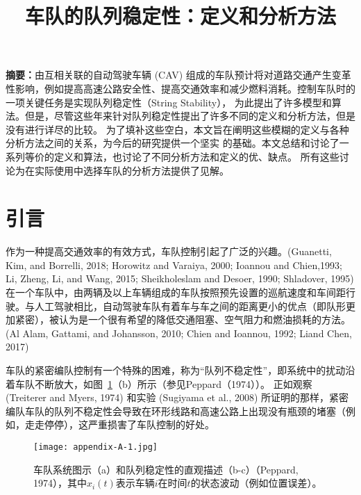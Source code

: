 
\begin{translation}
\label{cha:translation}

\title{车队的队列稳定性：定义和分析方法}
\maketitle


  \vspace{1em}
  \textbf{摘要：}由互相关联的自动驾驶车辆 (CAV) 组成的车队预计将对道路交通产生变革性影响，例如提高高速公路安全性、提高交通效率和减少燃料消耗。控制车队时的一项关键任务是实现队列稳定性（String Stability），
  为此提出了许多模型和算法。但是，尽管这些年来针对队列稳定性提出了许多不同的定义和分析方法，但是没有进行详尽的比较。 为了填补这些空白，本文旨在阐明这些模糊的定义与各种分析方法之间的关系，为今后的研究提供一个坚实
  的基础。本文总结和讨论了一系列等价的定义和算法，也讨论了不同分析方法和定义的优、缺点。 所有这些讨论为在实际使用中选择车队的分析方法提供了见解。

\section{引言}

  作为一种提高交通效率的有效方式，车队控制引起了广泛的兴趣。(Guanetti, Kim, and Borrelli, 2018; Horowitz and Varaiya, 2000; Ioannou and Chien,1993; Li, Zheng, Li, and Wang, 2015; Sheikholeslam and Desoer, 1990; Shladover, 1995)
  在一个车队中，由两辆及以上车辆组成的车队按照预先设置的巡航速度和车间距行驶。与人工驾驶相比，自动驾驶车队有着车与车之间的距离更小的优点（即队形更加紧密），被认为是一个很有希望的降低交通阻塞、空气阻力和燃油损耗的方法。
  (Al Alam, Gattami, and Johansson, 2010; Chien and Ioannou, 1992; Liand Chen, 2017)
  
  车队的紧密编队控制有一个特殊的困难，称为“队列不稳定性”，即系统中的扰动沿着车队不断放大，如图~\ref{fig:appendix-translation-figure1}（b）所示（参见Peppard（1974））。 
  正如观察 (Treiterer and Myers, 1974) 和实验 (Sugiyama et al., 2008) 所证明的那样，紧密编队车队的队列不稳定性会导致在环形线路和高速公路上出现没有瓶颈的堵塞（例如，走走停停），这严重损害了车队控制的好处。

\begin{figure}
  \centering
  \texttt{[image: appendix-A-1.jpg]}
  \caption{车队系统图示（a）和队列稳定性的直观描述（b-c）（Peppard, 1974），其中$x_i(t)$表示车辆$i$在时间$t$的状态波动（例如位置误差）。}
  \label{fig:appendix-translation-figure1}
\end{figure}
   

\end{translation}
